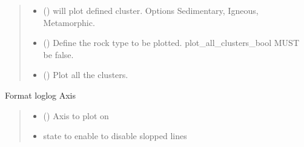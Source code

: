 \documentclass[letterpaper,10pt,english]{sphinxmanual}
\begin{document}
\begin{fulllineitems}
\begin{fulllineitems}
\begin{quote}
\begin{description}
\begin{itemize}
\item {} 
\sphinxAtStartPar
{} () \textendash{} will plot defined cluster. Options Sedimentary, Igneous, Metamorphic.

\item {} 
\sphinxAtStartPar
{} () \textendash{} Define the rock type to be plotted. plot\_all\_clusters\_bool MUST be false.

\item {} 
\sphinxAtStartPar
{} () \textendash{} Plot all the clusters.

\end{itemize}

\sphinxAtStartPar


\sphinxAtStartPar


\end{description}\end{quote}

\end{fulllineitems}


\begin{fulllineitems}
\label{\detokenize{pyrockmodulus:pyrockmodulus.pyrockmodulus.modulus_ratio.format_axis}}
\pysigstartsignatures
{}
\pysigstopsignatures
\sphinxAtStartPar
Format log\sphinxhyphen{}log Axis
\begin{quote}\begin{description}
\begin{itemize}
\item {} 
\sphinxAtStartPar
{} () \textendash{} Axis to plot on

\item {} 
\sphinxAtStartPar
{} \textendash{} state to enable to disable slopped lines


\end{itemize}
\end{description}
\end{quote}
\end{fulllineitems}
\end{fulllineitems}
\end{document}
